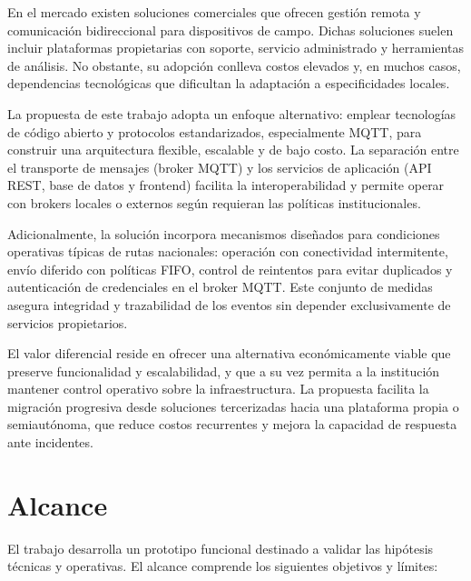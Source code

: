 En el mercado existen soluciones comerciales que ofrecen gestión remota y comunicación bidireccional para dispositivos de campo. Dichas soluciones suelen incluir plataformas propietarias con soporte, servicio administrado y herramientas de análisis. No obstante, su adopción conlleva costos elevados y, en muchos casos, dependencias tecnológicas que dificultan la adaptación a especificidades locales.

La propuesta de este trabajo adopta un enfoque alternativo: emplear tecnologías de código abierto y protocolos estandarizados, especialmente MQTT, para construir una arquitectura flexible, escalable y de bajo costo. La separación entre el transporte de mensajes (broker MQTT) y los servicios de aplicación (API REST, base de datos y frontend) facilita la interoperabilidad y permite operar con brokers locales o externos según requieran las políticas institucionales.

Adicionalmente, la solución incorpora mecanismos diseñados para condiciones operativas típicas de rutas nacionales: operación con conectividad intermitente, envío diferido con políticas FIFO, control de reintentos para evitar duplicados y autenticación de credenciales en el broker MQTT. Este conjunto de medidas asegura integridad y trazabilidad de los eventos sin depender exclusivamente de servicios propietarios.

El valor diferencial reside en ofrecer una alternativa económicamente viable que preserve funcionalidad y escalabilidad, y que a su vez permita a la institución mantener control operativo sobre la infraestructura. La propuesta facilita la migración progresiva desde soluciones tercerizadas hacia una plataforma propia o semiautónoma, que reduce costos recurrentes y mejora la capacidad de respuesta ante incidentes.


\section{Alcance}
El trabajo desarrolla un prototipo funcional destinado a validar las hipótesis técnicas y operativas. El alcance comprende los siguientes objetivos y límites:

